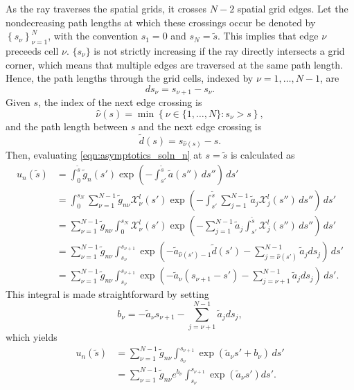 As the ray traverses the spatial grids, it crosses $N-2$ spatial grid edges.
Let the nondecreasing path lengths at which these crossings occur be denoted by
$\left\{s_\nu\right\}_{\nu=1}^{N}$, with the convention $s_1=0$ and $s_{N}=\tilde{s}$.
This implies that edge $\nu$ preceeds cell $\nu$.
$\{s_\nu\}$ is not strictly increasing if the ray directly intersects a grid corner,
which means that multiple edges are traversed at the same path length.
Hence, the path lengths through the grid cells, indexed by $\nu=1,\ldots,N-1$, are
\begin{equation*}
  ds_\nu = s_{\nu+1} - s_\nu.
\end{equation*}
Given $s$, the index of the next edge crossing is
\begin{equation*}
  \hat{\nu}(s) = \min\left\{ \nu \in \{1,\ldots,N\} : s_\nu>s \right\},
\end{equation*}
and the path length between $s$ and the next edge crossing is
\begin{equation*}
  \tilde{d}(s) = s_{\hat{\nu}(s)}-s.
\end{equation*}
Then, evaluating \eqref{eqn:asymptotics_soln_n} at $s=\tilde{s}$ is calculated as
\begin{align*}
  u_n(\tilde{s}) &= \int_0^{\tilde{s}}\tilde{g}_n(s')\exp\left( -\int_{s'}^{\tilde{s}}\tilde{a}(s'')\,ds'' \right)\, ds' \\
  &= \int_0^{s_N} \sum_{\nu=1}^{N-1}\tilde{g}_{n\nu}\mathcal{X}^l_\nu(s') \exp\left( -\int_{s'}^{\tilde{s}}\sum_{j=1}^{N-1}\tilde{a}_{j}\mathcal{X}^l_j(s'')\,ds'' \right)\, ds' \\
  &= \sum_{\nu=1}^{N-1}\tilde{g}_{n\nu}\int_0^{s_N} \mathcal{X}^l_\nu(s') \exp\left( -\sum_{j=1}^{N-1}\tilde{a}_{j}\int_{s'}^{\tilde{s}}\mathcal{X}^l_j(s'')\,ds'' \right)\, ds' \\
  &= \sum_{\nu=1}^{N-1}\tilde{g}_{n\nu}\int_{s_\nu}^{s_{\nu+1}}  \exp\left(-\tilde{a}_{\hat{\nu}(s')-1}\tilde{d}(s') -\sum_{j=\hat{\nu}(s')}^{N-1}\tilde{a}_{j}ds_j\right)\, ds' \\
  &= \sum_{\nu=1}^{N-1}\tilde{g}_{n\nu}\int_{s_\nu}^{s_{\nu+1}}  \exp\left(-\tilde{a}_{\nu}(s_{\nu+1}-s') -\sum_{j=\nu+1}^{N-1}\tilde{a}_{j}ds_j\right)\, ds'.
\end{align*}
This integral is made straightforward by setting
\begin{equation*}
  b_\nu = -\tilde{a}_{\nu}s_{\nu+1} - \sum_{j=\nu+1}^{N-1}\tilde{a}_{j}ds_j,
\end{equation*}
which yields
\begin{align*}
  u_n(\tilde{s}) &= \sum_{\nu=1}^{N-1}\tilde{g}_{n\nu}\int_{s_\nu}^{s_{\nu+1}}  \exp\left(\tilde{a}_{\nu}s' + b_\nu\right)\, ds' \\
                 &= \sum_{\nu=1}^{N-1}\tilde{g}_{n\nu}e^{b_\nu}\int_{s_\nu}^{s_{\nu+1}}  \exp\left(\tilde{a}_{\nu}s'\right) ds'.
\end{align*}
